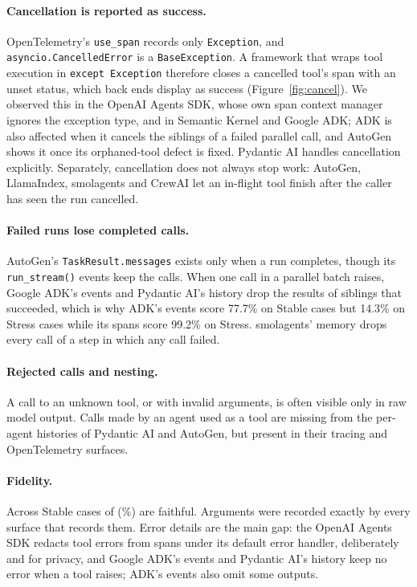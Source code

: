 \documentclass[10pt]{article}
\begin{document}
\paragraph{Cancellation is reported as success.} OpenTelemetry's \texttt{use\_span} records only \texttt{Exception}, and \texttt{asyncio.CancelledError} is a \texttt{BaseException}. A framework that wraps tool execution in \texttt{except Exception} therefore closes a cancelled tool's span with an unset status, which back ends display as success (Figure~\ref{fig:cancel}). We observed this in the OpenAI Agents SDK, whose own span context manager ignores the exception type, and in Semantic Kernel and Google ADK; ADK is also affected when it cancels the siblings of a failed parallel call, and AutoGen shows it once its orphaned-tool defect is fixed. Pydantic AI handles cancellation explicitly. Separately, cancellation does not always stop work: AutoGen, LlamaIndex, smolagents and CrewAI let an in-flight tool finish after the caller has seen the run cancelled.

\paragraph{Failed runs lose completed calls.} AutoGen's \texttt{TaskResult.messages} exists only when a run completes, though its \texttt{run\_stream()} events keep the calls. When one call in a parallel batch raises, Google ADK's events and Pydantic AI's history drop the results of siblings that succeeded, which is why ADK's events score 77.7\% on Stable cases but 14.3\% on Stress cases while its spans score 99.2\% on Stress. smolagents' memory drops every call of a step in which any call failed.

\paragraph{Rejected calls and nesting.} A call to an unknown tool, or with invalid arguments, is often visible only in raw model output. Calls made by an agent used as a tool are missing from the per-agent histories of Pydantic AI and AutoGen, but present in their tracing and OpenTelemetry surfaces.

\paragraph{Fidelity.} Across Stable cases \stableFaithful{} of \stableCases{} (\stableFaithfulPct\%) are faithful. Arguments were recorded exactly by every surface that records them. Error details are the main gap: the OpenAI Agents SDK redacts tool errors from spans under its default error handler, deliberately and for privacy, and Google ADK's events and Pydantic AI's history keep no error when a tool raises; ADK's events also omit some outputs.
\end{document}
